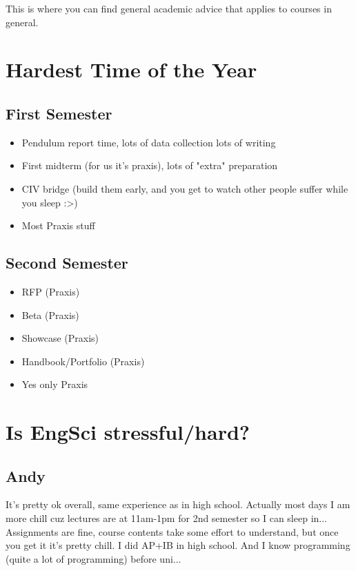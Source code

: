 This is where you can find general academic advice that applies to courses in general.

\section{Hardest Time of the Year}

\subsection{First Semester}
\begin{itemize}
    \item Pendulum report time, lots of data collection lots of writing
    \item First midterm (for us it's praxis), lots of "extra" preparation
    \item CIV bridge (build them early, and you get to watch other people suffer while you sleep :>)
    \item Most Praxis stuff
\end{itemize}

\subsection{Second Semester}
\begin{itemize}
    \item RFP (Praxis)
    \item Beta (Praxis)
    \item Showcase (Praxis)
    \item Handbook/Portfolio (Praxis)
    \item Yes only Praxis
\end{itemize}

\section{Is EngSci stressful/hard?}

\subsection{Andy}

It's pretty ok overall, same experience as in high school. Actually most days I am more chill cuz lectures are at 11am-1pm for 2nd semester so I can sleep in... Assignments are fine, course contents take some effort to understand, but once you get it it's pretty chill. I did AP+IB in high school. And I know programming (quite a lot of programming) before uni...

